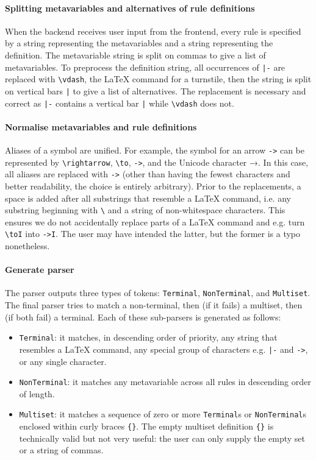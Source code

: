 \paragraph{Splitting metavariables and alternatives of rule definitions}
When the backend receives user input from the frontend, every rule is specified by a string representing the metavariables and a string representing the definition. The metavariable string is split on commas to give a list of metavariables. To preprocess the definition string, all occurrences of \lstinline{|-} are replaced with \lstinline{\vdash}, the \LaTeX{} command for a turnstile, then the string is split on vertical bars \lstinline{|} to give a list of alternatives. The replacement is necessary and correct as \lstinline{|-} contains a vertical bar \lstinline{|} while \lstinline{\vdash} does not.

\paragraph{Normalise metavariables and rule definitions}
\label{syntax:normalise}
Aliases of a symbol are unified. For example, the symbol for an arrow \lstinline{->} can be represented by \lstinline{\rightarrow}, \lstinline{\to}, \lstinline{->}, and the Unicode character →. In this case, all aliases are replaced with \lstinline{->} (other than having the fewest characters and better readability, the choice is entirely arbitrary). Prior to the replacements, a space is added after all substrings that resemble a \LaTeX{} command, i.e. any substring beginning with \lstinline{\} and a string of non-whitespace characters. This ensures we do not accidentally replace parts of a \LaTeX{} command and e.g. turn \lstinline{\toI} into \lstinline{->I}. The user may have intended the latter, but the former is a typo nonetheless.

\paragraph{Generate parser}
The parser outputs three types of tokens: \lstinline{Terminal}, \lstinline{NonTerminal}, and \lstinline{Multiset}. The final parser tries to match a non-terminal, then (if it fails) a multiset, then (if both fail) a terminal. Each of these sub-parsers is generated as follows:
\begin{itemize}
    \item \lstinline{Terminal}: it matches, in descending order of priority, any string that resembles a \LaTeX{} command, any special group of characters e.g. \lstinline{|-} and \lstinline{->}, or any single character.
    \item \lstinline{NonTerminal}: it matches any metavariable across all rules in descending order of length.
    \item \lstinline{Multiset}: it matches a sequence of zero or more \lstinline{Terminal}s or \lstinline{NonTerminal}s enclosed within curly braces \lstinline|{}|. The empty multiset definition \lstinline|{}| is technically valid but not very useful: the user can only supply the empty set or a string of commas.
\end{itemize}

